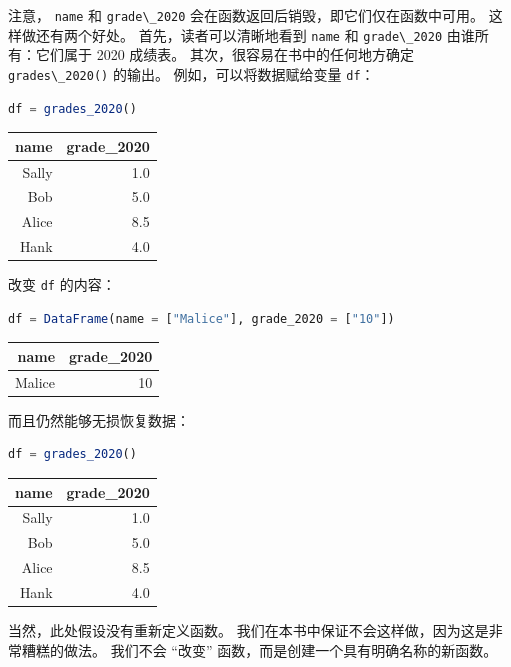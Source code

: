 \documentclass[
  notoc %
]{tufte-book}
\newcommand{\passthrough}[1]{#1}
\begin{document}
注意， \passthrough{\lstinline!name!} 和
\passthrough{\lstinline!grade\_2020!}
会在函数返回后销毁，即它们仅在函数中可用。 这样做还有两个好处。
首先，读者可以清晰地看到 \passthrough{\lstinline!name!} 和
\passthrough{\lstinline!grade\_2020!} 由谁所有：它们属于 2020 成绩表。
其次，很容易在书中的任何地方确定
\passthrough{\lstinline!grades\_2020()!} 的输出。
例如，可以将数据赋给变量 \passthrough{\lstinline!df!}：

\begin{lstlisting}[language=Julia]
df = grades_2020()
\end{lstlisting}

\begin{longtable}[]{@{}rr@{}}
\toprule
name & grade\_2020 \\
\midrule
\endhead
Sally & 1.0 \\
Bob & 5.0 \\
Alice & 8.5 \\
Hank & 4.0 \\
\bottomrule
\end{longtable}

改变 \passthrough{\lstinline!df!} 的内容：

\begin{lstlisting}[language=Julia]
df = DataFrame(name = ["Malice"], grade_2020 = ["10"])
\end{lstlisting}

\begin{longtable}[]{@{}rr@{}}
\toprule
name & grade\_2020 \\
\midrule
\endhead
Malice & 10 \\
\bottomrule
\end{longtable}

而且仍然能够无损恢复数据：

\begin{lstlisting}[language=Julia]
df = grades_2020()
\end{lstlisting}

\begin{longtable}[]{@{}rr@{}}
\toprule
name & grade\_2020 \\
\midrule
\endhead
Sally & 1.0 \\
Bob & 5.0 \\
Alice & 8.5 \\
Hank & 4.0 \\
\bottomrule
\end{longtable}

当然，此处假设没有重新定义函数。
我们在本书中保证不会这样做，因为这是非常糟糕的做法。 我们不会 ``改变''
函数，而是创建一个具有明确名称的新函数。
\end{document}
